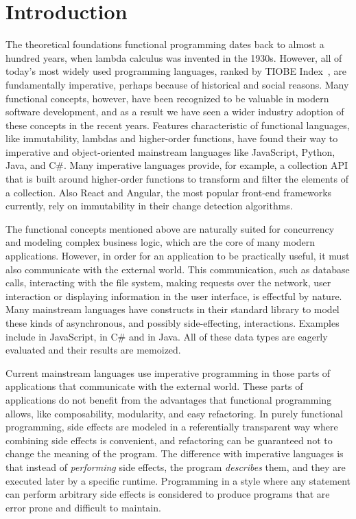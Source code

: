 \chapter{Introduction} \label{Introduction}
The theoretical foundations functional programming dates back to almost a hundred years, when lambda calculus was invented in the 1930s. However, all of today's most widely used programming languages, ranked by TIOBE Index~\cite{tiobe-index}, are fundamentally imperative, perhaps because of historical and social reasons. Many functional concepts, however, have been recognized to be valuable in modern software development, and as a result we have seen a wider industry adoption of these concepts in the recent years. Features characteristic of functional languages, like immutability, lambdas and higher-order functions, have found their way to imperative and object-oriented mainstream languages like JavaScript, Python, Java, and C\#. Many imperative languages provide, for example, a collection API that is built around higher-order functions to transform and filter the elements of a collection. Also React and Angular, the most popular front-end frameworks currently, rely on immutability in their change detection algorithms.

The functional concepts mentioned above are naturally suited for concurrency and modeling complex business logic, which are the core of many modern applications. However, in order for an application to be practically useful, it must also communicate with the external world. This communication, such as database calls, interacting with the file system, making requests over the network, user interaction or displaying information in the user interface, is effectful by nature. Many mainstream languages have constructs in their standard library to model these kinds of asynchronous, and possibly side-effecting, interactions. Examples include  in JavaScript,  in C\# and  in Java. All of these data types are eagerly evaluated and their results are memoized.

Current mainstream languages use imperative programming in those parts of applications that communicate with the external world. These parts of applications do not benefit from the advantages that functional programming allows, like composability, modularity, and easy refactoring. In purely functional programming, side effects are modeled in a referentially transparent way where combining side effects is convenient, and refactoring can be guaranteed not to change the meaning of the program. The difference with imperative languages is that instead of \textit{performing} side effects, the program \textit{describes} them, and they are executed later by a specific runtime. Programming in a style where any statement can perform arbitrary side effects is considered to produce programs that are error prone and difficult to maintain.~\cite[Chapter~3]{sicp}


